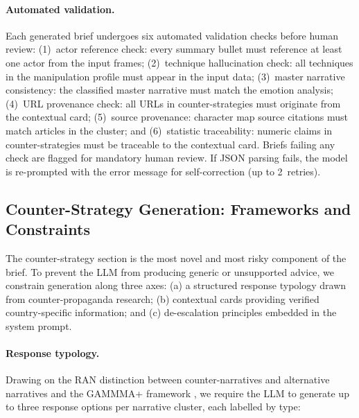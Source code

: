 \documentclass[10pt, a4paper]{article}
\begin{document}
\paragraph{Automated validation.}
Each generated brief undergoes six automated validation checks before human review: (1)~actor reference check: every summary bullet must reference at least one actor from the input frames; (2)~technique hallucination check: all techniques in the manipulation profile must appear in the input data; (3)~master narrative consistency: the classified master narrative must match the emotion analysis; (4)~URL provenance check: all URLs in counter-strategies must originate from the contextual card; (5)~source provenance: character map source citations must match articles in the cluster; and (6)~statistic traceability: numeric claims in counter-strategies must be traceable to the contextual card. Briefs failing any check are flagged for mandatory human review. If JSON parsing fails, the model is re-prompted with the error message for self-correction (up to 2~retries).


\subsection{Counter-Strategy Generation: Frameworks and Constraints}
\label{sec:counterstrategy}

The counter-strategy section is the most novel and most risky component of the brief. To prevent the LLM from producing generic or unsupported advice, we constrain generation along three axes: (a) a structured response typology drawn from counter-propaganda research; (b) contextual cards providing verified country-specific information; and (c) de-escalation principles embedded in the system prompt.

\paragraph{Response typology.}
Drawing on the RAN distinction between counter-narratives and alternative narratives \citep{ran2022alternative, briggs2015western} and the GAMMMA+ framework \citep{silverman2016impact}, we require the LLM to generate up to three response options per narrative cluster, each labelled by type:
\end{document}
